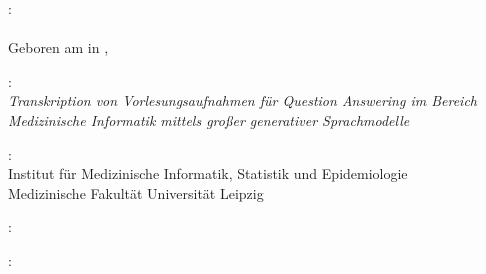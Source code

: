 \thispagestyle{empty}

\hfill

\vfill

\noindent{}: \\
\myName{}\\%
Geboren am {\mybirthday} in {\mybirthtown}, {\mybirthcountry}
\medskip

\noindent{}: \\
\emph{Transkription von Vorlesungsaufnahmen für Question Answering im Bereich Medizinische Informatik mittels großer generativer Sprachmodelle}

\medskip

\noindent{}: \\
Institut für Medizinische Informatik, Statistik und Epidemiologie \\
Medizinische Fakultät
Universität Leipzig

\medskip

\noindent{}: \\
\myProf

\medskip

\noindent{}: \\
\mySupervisor

